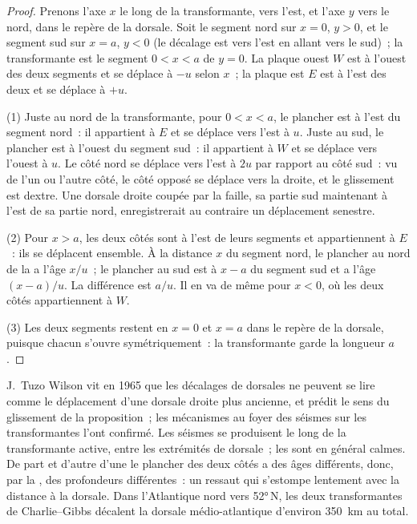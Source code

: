 \begin{proof}
Prenons l'axe $x$ le long de la transformante, vers l'est, et l'axe $y$
vers le nord, dans le repère de la dorsale. Soit le segment nord sur
$x = 0$, $y > 0$, et le segment sud sur $x = a$, $y < 0$ (le décalage est vers
l'est en allant vers le sud)~; la transformante est le segment $0 < x < a$ de $y = 0$. La
plaque ouest $W$ est à l'ouest des deux segments et se déplace à $-u$ selon $x$~; la
plaque est $E$ est à l'est des deux et se déplace à $+u$.

(1) Juste au nord de la transformante, pour $0 < x < a$, le plancher est à l'est du
segment nord~: il appartient à $E$ et se déplace vers l'est à $u$. Juste au sud, le
plancher est à l'ouest du segment sud~: il appartient à $W$ et se déplace vers l'ouest à
$u$. Le côté nord se déplace vers l'est à $2u$ par rapport au côté sud~: vu
de l'un ou l'autre côté, le côté opposé se déplace vers la droite, et le glissement est
dextre. Une dorsale droite coupée par la faille, sa partie sud
maintenant à l'est de sa partie nord, enregistrerait au contraire un déplacement
senestre.

(2) Pour $x > a$, les deux côtés sont à l'est de leurs segments et appartiennent à $E$~: ils
se déplacent ensemble. À la distance $x$ du segment nord, le plancher au nord de
la  a l'âge $x/u$~; le plancher au sud est à $x - a$ du
segment sud et a l'âge $(x - a)/u$. La différence est $a/u$. Il en va de même
pour $x < 0$, où les deux côtés appartiennent à $W$.

(3) Les deux segments restent en $x = 0$ et $x = a$ dans le repère de la dorsale, puisque
chacun s'ouvre symétriquement~: la transformante garde la longueur $a$.
\end{proof}

J.\ Tuzo Wilson vit en 1965 que les décalages de dorsales ne peuvent se lire comme le
déplacement d'une dorsale droite plus ancienne, et prédit le sens du glissement
de la proposition~; les mécanismes au foyer des séismes sur les transformantes
l'ont confirmé. Les séismes se produisent le long de la transformante active, entre les extrémités de
dorsale~; les  sont en général calmes. De part et d'autre d'une
 le plancher des deux côtés a des âges différents, donc, par la
, des profondeurs différentes~: un ressaut qui s'estompe lentement avec la distance à
la dorsale. Dans l'Atlantique nord vers \ang{52}\,N, les deux
transformantes de Charlie--Gibbs décalent la dorsale médio-atlantique d'environ \qty{350}{km} au total.

